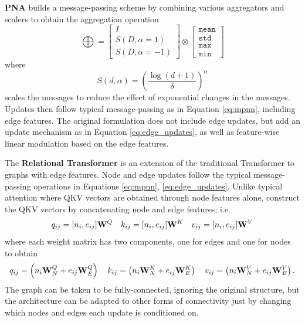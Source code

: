 \textbf{PNA} \citep{corsoPrincipalNeighbourhoodAggregation2020} builds a message-passing scheme by combining various aggregators and scalers to obtain the aggregation operation
\begin{equation}
    \bigoplus = 
    \left[ \begin{array}{c}
        I \\ 
        S(D, \alpha = 1) \\ 
        S(D, \alpha = -1)
        \end{array} \right]
    \otimes
    \left[ \begin{array}{c}
        \texttt{mean} \\
        \texttt{std} \\
        \texttt{max} \\
        \texttt{min}
        \end{array} \right]
\end{equation}
where 
\begin{equation}
    S(d, \alpha) = \left( \frac{\log(d+1)}{\delta} \right)^\alpha
\end{equation}
scales the messages to reduce the effect of exponential changes in the messages. Updates then follow typical message-passing as in Equation \ref{eq:mpnn}, including edge features. The original formulation does not include edge updates, but \citet{kofinasGraphNeuralNetworks2024} add an update mechanism as in Equation \ref{eq:edge_updates}, as well as feature-wise linear modulation \citep{brockschmidtGNNFiLMGraphNeural2020} based on the edge features. 

The \textbf{Relational Transformer} \citep{diaoRelationalAttentionGeneralizing2023} is an extension of the traditional Transformer \citep{vaswaniAttentionAllYou2017a} to graphs with edge features. Node and edge updates follow the typical message-passing operations in Equations \ref{eq:mpnn}, \ref{eq:edge_updates}. Unlike typical attention where QKV vectors are obtained through node features alone, \citet{diaoRelationalAttentionGeneralizing2023} construct the QKV vectors by concatenating node and edge features; i.e.
\begin{equation}
    q_{ij} = [n_i, e_{ij}]\mathbf{W}^Q \quad
    k_{ij} = [n_i, e_{ij}]\mathbf{W}^K \quad
    v_{ij} = [n_i, e_{ij}]\mathbf{W}^V 
\end{equation}
where each weight matrix has two components, one for edges and one for nodes to obtain
\begin{equation}
    q_{ij} = \left( n_i \mathbf{W}_N^Q + e_{ij}\mathbf{W}_E^Q \right) \quad
    k_{ij} = \left( n_i \mathbf{W}_N^K + e_{ij}\mathbf{W}_E^K \right) \quad
    v_{ij} = \left( n_i \mathbf{W}_N^V + e_{ij}\mathbf{W}_E^V \right).
\end{equation}
The graph can be taken to be fully-connected, ignoring the original structure, but the architecture can be adapted to other forms of connectivity just by changing which nodes and edges each update is conditioned on. 

